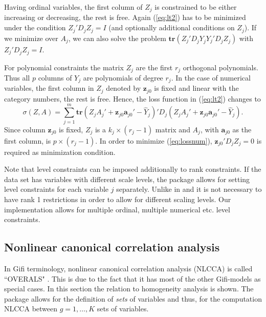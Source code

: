 \documentclass[article, nojss]{jss}
\begin{document}
Having ordinal variables, the first column of $Z_j$ is constrained to be either increasing or decreasing, the rest is free. Again (\ref{eq:lt2}) has to be minimized under the condition $Z_j'D_j^{}Z_j^{}=I$ (and optionally additional conditions on $Z_j$). If we minimize over $A_j$, we can also solve the problem $\mathbf{tr}(Z_j'D_j^{}Y_j^{}Y_j'D_j^{}Z_j^{})$ with $Z_j'D_j^{}Z_j^{}=I$.

For polynomial constraints the matrix $Z_j$ are the first \(r_j\) orthogonal polynomials. Thus all \(p\) columns of \(Y_j\) are polynomials of degree \(r_j\).  In the case of numerical variables, the first column in $Z_j$ denoted by $\mathbf{z}_{j0}$ is fixed and linear with the category numbers, the rest is free. 
Hence, the loss function in (\ref{eq:lt2}) changes to 
\begin{equation}
\label{eq:lossnum}
\sigma(Z,A)=\sum_{j=1}^m \mathbf{tr}(Z_jA_j'+\mathbf{z}_{j0}\mathbf{a}_{j0}'- \hat Y_j)'D_j(Z_jA_j'+\mathbf{z}_{j0}\mathbf{a}_{j0}'-\hat Y_j).
\end{equation}
Since column $\mathbf{z}_{j0}$ is fixed, $Z_j$ is a $k_j \times (r_j-1)$ matrix and $A_j$, with $\mathbf{a}_{j0}$ as the first column, is $p \times (r_j-1)$. In order to minimize (\ref{eq:lossnum}), $\mathbf{z}_{j0}'D_jZ_j=0$ is required as minimization condition.

Note that level constraints can be imposed additionally to rank constraints. If the data set has variables with different scale levels, the  package allows for setting level constraints for each variable $j$ separately. Unlike in \citet{Gifi:90} and \citet{Michailidis+deLeeuw:98} it is not necessary to have rank 1 restrictions in order to allow for different scaling levels. Our implementation allows for multiple ordinal, multiple numerical etc. level constraints. 

\subsection{Nonlinear canonical correlation analysis}
In Gifi terminology, nonlinear canonical correlation analysis (NLCCA) is called ``OVERALS" \citep{vanderBurg+deLeeuw+Verdegaal:88, vanderBurg+deLeeuw+Dijksterhuis:94}. This is due to the fact that it has most of the other Gifi-models as special cases. 
In this section the relation to homogeneity analysis is shown. The  package allows for the definition of \emph{sets} of variables and thus, for the computation NLCCA between $g = 1,\ldots,K$ sets of variables. 
\end{document}
